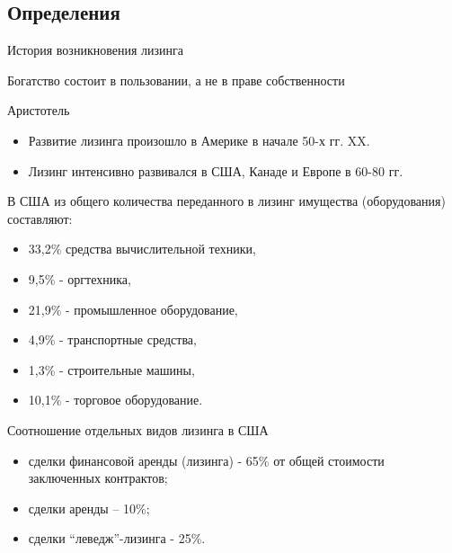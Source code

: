 \documentclass[_Banking_p3.tex]{subfiles}
\begin{document}
\subsection{Определения}
\begin{frame}{История возникновения лизинга}
\begin{block}
\quad
Богатство состоит в пользовании, а не в праве собственности

Аристотель
\end{block}
\begin{itemize}
\item
Развитие лизинга произошло в Америке в начале 50-х гг. XX.
\item
Лизинг интенсивно развивался в США, Канаде и Европе в 60-80 гг.
\end{itemize}
\end{frame}

\begin{frame}{}
В США из общего количества переданного в лизинг имущества (оборудования) составляют:

\begin{itemize}
\item
33,2\% средства вычислительной техники, 
\item
9,5\% - оргтехника, 
\item
21,9\% - промышленное оборудование, 
\item
4,9\% - транспортные средства, 
\item
1,3\% - строительные машины, 
\item
10,1\% - торговое оборудование.
\end{itemize}
\end{frame}

\begin{frame}{Соотношение отдельных видов лизинга в США}
\begin{itemize}
\item
сделки финансовой аренды (лизинга) - 65\% от общей стоимости заключенных контрактов;
\item
сделки аренды – 10\%;
\item
сделки ``леведж''-лизинга - 25\%.
\end{itemize}
\end{frame}
\end{document}
